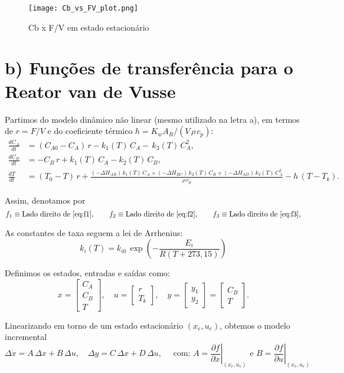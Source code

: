 \documentclass{article}
\begin{document}


\begin{figure}[ht]
  \centering
  \texttt{[image: Cb\_vs\_FV\_plot.png]}
  \caption{Cb x F/V em estado estacionário}
\end{figure}

\section*{b) Funções de transferência para o Reator van de Vusse}

Partimos do modelo dinâmico não linear (mesmo utilizado na letra a), em termos de $r = F/V$ e do coeficiente térmico $h = K_w A_R/(V\,\rho\,c_p)$:
\begin{align}
\frac{dC_A}{dt} &= (C_{A0} - C_A)\,r - k_1(T)\,C_A - \,k_3(T)\,C_A^2, \label{eq:f1}\\
\frac{dC_B}{dt} &= -C_B\,r + k_1(T)\,C_A - k_2(T)\,C_B, \label{eq:f2}\\
\frac{dT}{dt} &= (T_0 - T)\,r + \frac{(-\Delta H_{AB})\,k_1(T)\,C_A + (-\Delta H_{BC})\,k_2(T)\,C_B + (-\Delta H_{AD})\,k_3(T)\,C_A^2}{\rho\,c_p} - h\,(T - T_k). \label{eq:f3}
\end{align}

Assim, denotamos por
\[
f_1 \equiv \text{Lado direito de } \eqref{eq:f1}, \qquad
f_2 \equiv \text{Lado direito de } \eqref{eq:f2}, \qquad
f_3 \equiv \text{Lado direito de } \eqref{eq:f3},
\]

As constantes de taxa seguem a lei de Arrhenius:
\[
k_i(T) = k_{i0}\,\exp\!\left(-\frac{E_i}{R(T + 273{,}15)}\right)
\]

Definimos os estados, entradas e saídas como:
\[
x = \begin{bmatrix} C_A \\ C_B \\ T \end{bmatrix}, \quad
u = \begin{bmatrix} r \\ T_k \end{bmatrix}, \quad
y = \begin{bmatrix} y_1 \\ y_2 \end{bmatrix} =
\begin{bmatrix} C_B \\ T \end{bmatrix}.
\]

Linearizando em torno de um estado estacionário $(x_e,u_e)$, obtemos o modelo incremental
\[
\Delta\dot{x} = A\,\Delta x + B\,\Delta u, \quad
\Delta y = C\,\Delta x + D\,\Delta u, \quad \text{ com: } A = \left.\dfrac{\partial f}{\partial x}\right|_{(x_e,u_e)} \text{ e } B = \left.\dfrac{\partial f}{\partial u}\right|_{(x_e,u_e)}
\]
\end{document}
